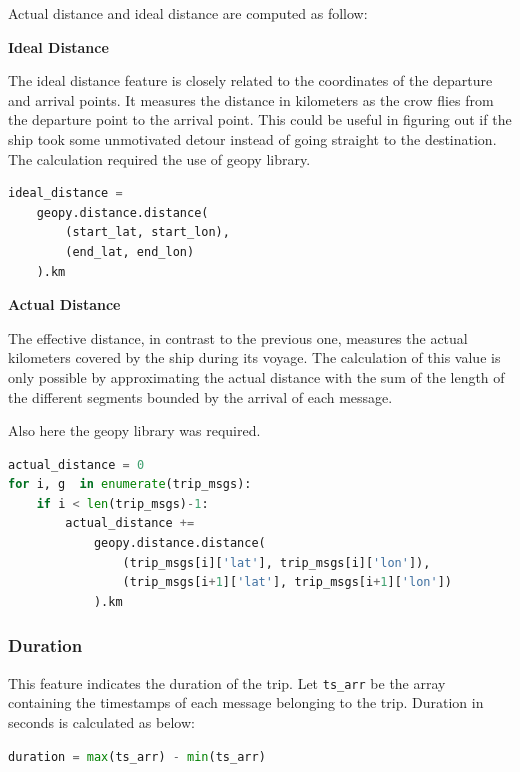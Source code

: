     Actual distance and ideal distance are computed as follow:
    
    \textbf{Ideal Distance}
    
    The ideal distance feature is closely related to the coordinates of the departure and arrival points. It measures the distance in kilometers as the crow flies from the departure point to the arrival point. This could be useful in figuring out if the ship took some unmotivated detour instead of going straight to the destination.
    \\
    The calculation required the use of geopy \cite{geopy} library.
    
    \begin{minipage}{\linewidth}
    \begin{lstlisting}[language=Python]
ideal_distance =
    geopy.distance.distance(
        (start_lat, start_lon),
        (end_lat, end_lon)
    ).km
    \end{lstlisting} 
    \end{minipage}

    
    \textbf{Actual Distance}
    
    The effective distance, in contrast to the previous one, measures the actual kilometers covered by the ship during its voyage. The calculation of this value is only possible by approximating the actual distance with the sum of the length of the different segments bounded by the arrival of each message.
    
    Also here the geopy \cite{geopy} library was required.
        
    \begin{lstlisting}[language=Python]
actual_distance = 0
for i, g  in enumerate(trip_msgs):
    if i < len(trip_msgs)-1:
        actual_distance += 
            geopy.distance.distance(
                (trip_msgs[i]['lat'], trip_msgs[i]['lon']),
                (trip_msgs[i+1]['lat'], trip_msgs[i+1]['lon'])
            ).km
    \end{lstlisting}
    
    \subsubsection{Duration}

    This feature indicates the duration of the trip. Let \verb|ts_arr| be the array containing the timestamps of each message belonging to the trip. Duration in seconds is calculated as below:
    
    \begin{lstlisting}[language=Python]
duration = max(ts_arr) - min(ts_arr)
    \end{lstlisting}

